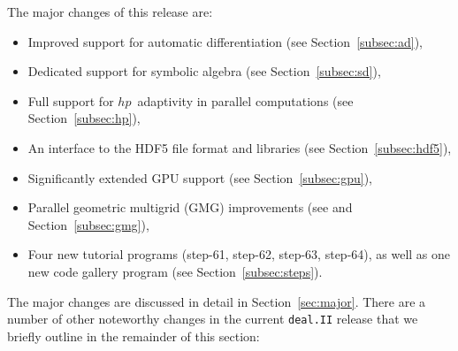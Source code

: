 \documentclass{ansarticle-preprint}
\newcommand{\specialword}[1]{\texttt{#1}}
\newcommand{\dealii}{{\specialword{deal.II}}\xspace}
\begin{document}
The major changes of this release are:
%
\begin{itemize}
  \item Improved support for automatic differentiation (see
    Section~\ref{subsec:ad}),
  \item Dedicated support for symbolic algebra (see
    Section~\ref{subsec:sd}),
  \item Full support for $hp$~adaptivity in parallel computations (see
    Section~\ref{subsec:hp}),
  \item An interface to the HDF5 file format and libraries (see
    Section~\ref{subsec:hdf5}),
  \item Significantly extended GPU support (see Section~\ref{subsec:gpu}),
  \item Parallel geometric multigrid (GMG) improvements (see
    \cite{ClevengerHeisterKanschatKronbichler2019} and
    Section~\ref{subsec:gmg}),
  \item Four new tutorial programs (step-61, step-62, step-63, step-64),
    as well as one new code gallery program (see
    Section~\ref{subsec:steps}).
\end{itemize}
%
The major changes are discussed in detail in Section~\ref{sec:major}. There
are a number of other noteworthy changes in the current \dealii{} release
that we briefly outline in the remainder of this section:
%
\end{document}
